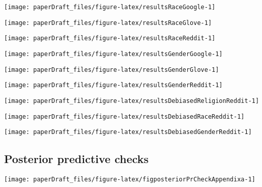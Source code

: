 \documentclass[
  12pt,
  dvipsnames,enabledeprecatedfontcommands]{scrartcl}
\begin{document}
\begin{center}\texttt{[image: paperDraft\_files/figure-latex/resultsRaceGoogle-1]} \end{center}

\begin{center}\texttt{[image: paperDraft\_files/figure-latex/resultsRaceGlove-1]} \end{center}

\begin{center}\texttt{[image: paperDraft\_files/figure-latex/resultsRaceReddit-1]} \end{center}

\begin{center}\texttt{[image: paperDraft\_files/figure-latex/resultsGenderGoogle-1]} \end{center}

\begin{center}\texttt{[image: paperDraft\_files/figure-latex/resultsGenderGlove-1]} \end{center}

\begin{center}\texttt{[image: paperDraft\_files/figure-latex/resultsGenderReddit-1]} \end{center}

\begin{center}\texttt{[image: paperDraft\_files/figure-latex/resultsDebiasedReligionReddit-1]} \end{center}

\begin{center}\texttt{[image: paperDraft\_files/figure-latex/resultsDebiasedRaceReddit-1]} \end{center}

\begin{center}\texttt{[image: paperDraft\_files/figure-latex/resultsDebiasedGenderReddit-1]} \end{center}

\hypertarget{posterior-predictive-checks}{%
\subsection{Posterior predictive
checks}\label{posterior-predictive-checks}}

\begin{center}\texttt{[image: paperDraft\_files/figure-latex/figposteriorPrCheckAppendixa-1]} \end{center}
\end{document}
